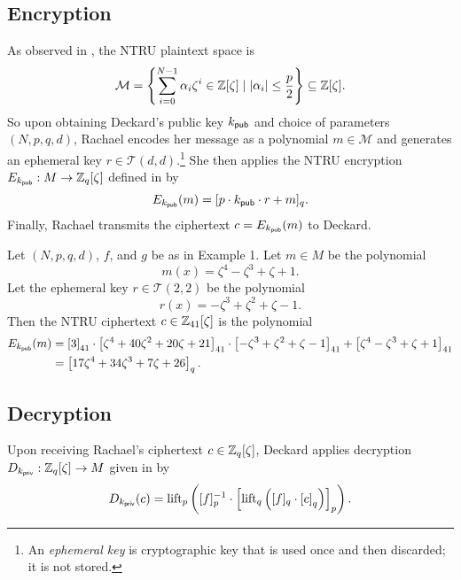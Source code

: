 \documentclass[10pt,reqno]{article}
\begin{document}
\subsection{Encryption}\label{subsec:encryption}
As observed in \cite[page 393]{Pipher_josephh.}, the NTRU plaintext space is
\[\mathcal{M} = \left \{ \sum_{i=0}^{N-1} \alpha_i \zeta^i \in \Z[\zeta] \mid \abs{\alpha_i}\leq \frac{p}{2} \right\} \subseteq \Z[\zeta].\]
So upon obtaining Deckard's public key $k_{\sf{pub}}$ and choice of parameters $(N,p,q,d)$,
Rachael encodes her message as a polynomial $m \in \mathcal{M}$ and generates an ephemeral key $r \in \mathcal{T}(d,d)$.\footnote{An \emph{ephemeral key} is cryptographic key that is used once and then discarded; it is not stored.} She then applies the NTRU encryption $E_{k_{\sf{pub}}}: M \to \Z_q[\zeta]$ defined in \cite{Hoffstein98ntru:a} by
\[E_{k_{\sf{pub}}}(m) =[p\cdot k_{\sf{pub}} \cdot r + m]_q.\]
Finally, Rachael transmits the ciphertext $c=E_{k_{\sf{pub}}}(m)$ to Deckard. 
\begin{example}\label{ex:encryption}
    Let $(N,p,q,d)$, $f$, and $g$ be as in Example 1. Let $m \in M$ be the polynomial
    \[m(x) = \zeta^4-\zeta^3+\zeta+1.\]
Let the ephemeral key $r \in \mathcal{T}(2,2)$ be the polynomial
    \[r(x)=-\zeta^3+\zeta^2+\zeta-1.\]
    Then the NTRU ciphertext $c \in \Z_{41}[\zeta]$ is the polynomial
    \begin{align*}
        E_{k_{\sf{pub}}}(m) &= \eq{ 3}{41} \cdot \eq{\zeta^4+40\zeta^2+20\zeta+21}{41} \cdot \eq{-\zeta^3+\zeta^2+\zeta-1}{41}+\eq{\zeta^4-\zeta^3+\zeta+1}{41}
        \\&=\eq{17\zeta^4+34\zeta^3+7\zeta+26}{q}.
    \end{align*}
    \end{example}

\subsection{Decryption}\label{subsec:decryption}
Upon receiving Rachael's ciphertext $c \in \Z_q[\zeta]$, Deckard applies decryption $D_{k_{\sf{priv}}}: \Z_q[\zeta] \to M$ given in \cite{Hoffstein98ntru:a} by
        \[D_{k_{\sf{priv}}} (c) = \lift{ [f]_p^{-1} \cdot \left [ \lift{ [f]_q \cdot \left[ c \right]_q }{q} \right]_p }{p}.\]
\end{document}

